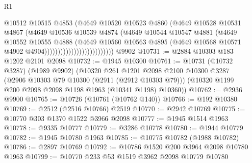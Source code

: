 \begin{lexlean}{R1}
\begin{coremodule}
                                          @10512
                                          @10515
                                          @4853
                                          (@4649
                                            @10520
                                            @10523
                                            @4860
                                            (@4649
                                              @10528
                                              @10531
                                              @4867
                                              (@4649
                                                @10536
                                                @10539
                                                @4874
                                                (@4649
                                                  @10544
                                                  @10547
                                                  @4881
                                                  (@4649
                                                    @10552
                                                    @10555
                                                    @4888
                                                    (@4649
                                                      @10560
                                                      @10563
                                                      @4895
                                                      (@4649
                                                        @10568
                                                        @10571
                                                        @4902
                                                        @4904))))))))))))))))))))))))))
    @9902
@10731 := @2884 @10303 @183 @1202 @2101 @2098
@10732 := @1945 @10300
@10761 := @10731
    (@10732 @3287)
    (@1989 @9902)
    (@10320
      @261
      @1201
      @2098
      @2100
      @10300
      @3287
      (@2906 @10303 @79 @10300 (@2911 (@2912 @10303 @79)))
      (@10320 @1199 @200 @2098 @2098 @1198 @1963 (@10341 @1198) @10360))
@10762 := @2936 @9900
@10765 := @10726 (@10761 (@10762 @140))
@10766 := @192 @10380
@10769 := @2512 (@2516 @10766) @2519
@10770 := @2942 @10769
@10775 := @10770 @303 @1370 @1522 @3966 @2098
@10777 := @1945 @1514 @1963
@10778 := @9335 @10777
@10779 := @3286 @10778
@10780 := @1944 @10779
@10782 := @1945 @10780 @1963
@10785 := @10775 @10782 (@1988 @10782)
@10786 := @2897 @10769
@10792 := @10786 @1520 @200 @3964 @2098 @10780 @1963
@10799 := @10770 @233 @53 @1519 @3962 @2098 @10779 @10780

\end{coremodule}
\end{lexlean}
